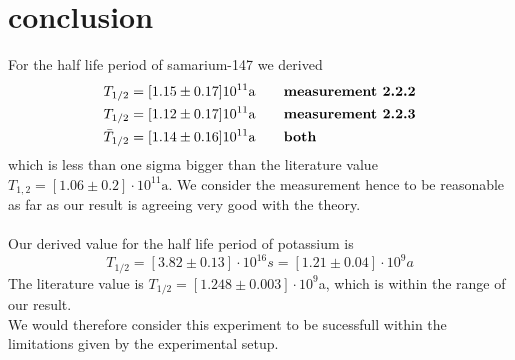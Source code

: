 \section{conclusion}
\label{sec:conclusion}
For the half life period of samarium-147 we derived
\begin{align}
T_{1/2} &= [1.15\pm0.17]10^{11}\mathrm{a} \qquad \text{\textbf{measurement 2.2.2}}\\ 
T_{1/2} &= [1.12\pm0.17]10^{11}\mathrm{a} \qquad \text{\textbf{measurement 2.2.3}}\\
\bar{T}_{1/2} &= [1.14\pm0.16]10^{11}\mathrm{a} \qquad \text{\textbf{both}}
\end{align}
which is less than one sigma bigger than the literature value $T_{1,2} =[1.06\pm0.2]\cdot10^{11} \mathrm{a}$.
We consider the measurement hence to be reasonable as far as our result is agreeing very good with the theory.\\\\

Our derived value for the half life period of potassium is
\begin{equation*}
T_{1/2} =  [3.82\pm0.13]\cdot 10^{16} s = [1.21 \pm 0.04]\cdot 10^9 a
\end{equation*}
The literature value is $T_{1/2} = [1.248 \pm 0.003]\cdot10^9$a, which is within the range of our result. \\
We would therefore consider this experiment to be sucessfull within the limitations given by the experimental
setup. 
